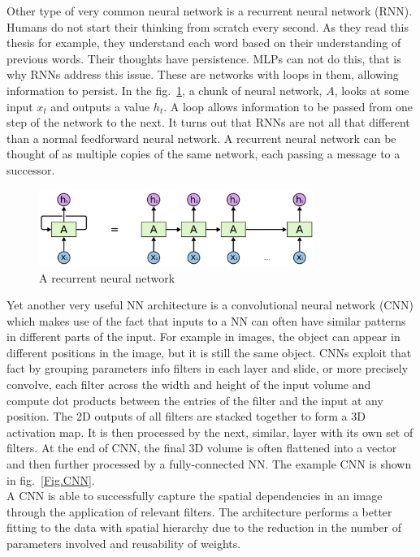 Other type of very common neural network is a recurrent neural network (RNN). Humans do not start their thinking from scratch every second. As they read this thesis for example, they understand each word based on their understanding of previous words. Their thoughts have persistence. MLPs can not do this, that is why RNNs address this issue. These are networks with loops in them, allowing information to persist. In the fig.~\ref{Fig.RNN}, a chunk of neural network, $A$, looks at some input $x_t$ and outputs a value $h_t$. A loop allows information to be passed from one step of the network to the next. It turns out that RNNs are not all that different than a normal feedforward neural network. A recurrent neural network can be thought of as multiple copies of the same network, each passing a message to a successor.

\begin{figure}[H]
\includegraphics[width=0.8\textwidth,keepaspectratio]{figures/RNN.png}
\caption{A recurrent neural network \cite{Blog.RNNs}}
\label{Fig.RNN}
\end{figure}

Yet another very useful NN architecture is a convolutional neural network (CNN) which makes use of the fact that inputs to a NN can often have similar patterns in different parts of the input. For example in images, the object can appear in different positions in the image, but it is still the same object. CNNs exploit that fact by grouping parameters info filters in each layer and slide, or more precisely convolve, each filter across the width and height of the input volume and compute dot products between the entries of the filter and the input at any position. The 2D outputs of all filters are stacked together to form a 3D activation map. It is then processed by the next, similar, layer with its own set of filters. At the end of CNN, the final 3D volume is often flattened into a vector and then further processed by a fully-connected NN. The example CNN is shown in fig.~\ref{Fig.CNN}. \\
A CNN is able to successfully capture the spatial dependencies in an image through the application of relevant filters. The architecture performs a better fitting to the data with spatial hierarchy due to the reduction in the number of parameters involved and reusability of weights.

